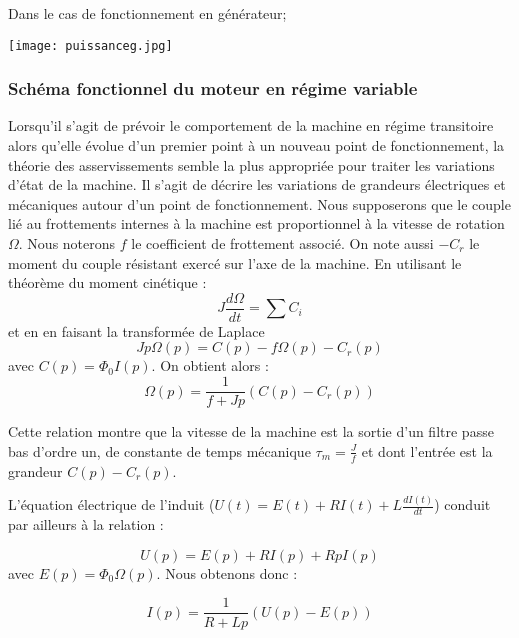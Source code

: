 \documentclass[12pt,prb,aps,epsf]{article}
\begin{document}
Dans le cas de fonctionnement en générateur;

\begin{center}
    \texttt{[image: puissanceg.jpg]}
\end{center}



\subsubsection{Schéma fonctionnel du moteur en régime variable}
Lorsqu'il s'agit de prévoir le comportement de la machine en régime transitoire alors qu'elle évolue d'un premier point à un nouveau point de fonctionnement, la théorie des asservissements semble la plus appropriée pour traiter les variations d'état de la machine. Il s'agit de décrire les variations de grandeurs électriques et mécaniques autour d'un point de fonctionnement. Nous supposerons que le couple lié au frottements internes à la machine est proportionnel à la vitesse de rotation $\Omega$. Nous noterons $f$ le coefficient de frottement associé. On note aussi $-C_r$ le moment du couple résistant exercé sur l'axe de la machine. 
\medskip
En utilisant le théorème du moment cinétique :
\begin{equation}
    J \frac{d\Omega}{dt} = \sum C_i
\end{equation}
et en en faisant la transformée de Laplace
\begin{equation}
    Jp\Omega(p) = C(p) - f\Omega(p) - C_r(p)
\end{equation}
avec $C(p) = \Phi_0 I(p)$. On obtient alors :
\begin{equation}
    \Omega (p) = \frac{1}{f + Jp}(C(p) - C_r(p))
\end{equation}

Cette relation montre que la vitesse de la machine est la sortie d'un filtre passe bas d'ordre un, de constante de temps mécanique $\tau_m = \frac{J}{f}$ et dont l'entrée est la grandeur $C(p) - C_r (p)$.\medskip

L'équation électrique de l'induit ($U(t) = E(t) + RI(t) + L \frac{dI (t)}{dt}$) conduit par ailleurs à la relation :

\begin{equation}
    U(p) = E(p) + RI(p) + RpI(p) 
\end{equation}
avec $E(p)=\Phi_0 \Omega(p)$. Nous obtenons donc :

\begin{equation}
    I(p) = \frac{1}{R + Lp}(U(p) - E(p))
\end{equation}
\end{document}
